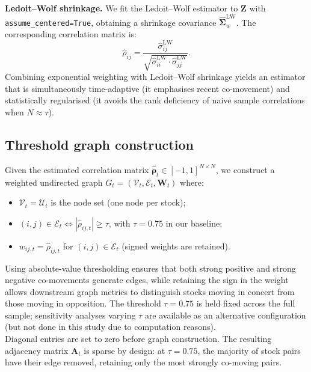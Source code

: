\documentclass{article}
\begin{document}
\noindent\textbf{Ledoit--Wolf shrinkage.} We fit the Ledoit--Wolf estimator \cite{ledoit2004} to $\mathbf{Z}$ with \texttt{assume\_centered=True}, obtaining a shrinkage covariance $\hat{\boldsymbol{\Sigma}}_w^{\text{LW}}$. The corresponding correlation matrix is:
\begin{equation}
    \hat{\rho}_{ij} = \frac{\hat{\sigma}_{ij}^{\text{LW}}}{\sqrt{\hat{\sigma}_{ii}^{\text{LW}} \cdot \hat{\sigma}_{jj}^{\text{LW}}}}.
\end{equation}
Combining exponential weighting with Ledoit--Wolf shrinkage yields an estimator that is simultaneously time-adaptive (it emphasises recent co-movement) and statistically regularised (it avoids the rank deficiency of naive sample correlations when $N \approx \tau$).

\subsection{Threshold graph construction}

Given the estimated correlation matrix $\hat{\boldsymbol{\rho}}_t \in [-1, 1]^{N \times N}$, we construct a weighted undirected graph $G_t = (\mathcal{V}_t, \mathcal{E}_t, \mathbf{W}_t)$ where:
\begin{itemize}
    \item $\mathcal{V}_t = \mathcal{U}_t$ is the node set (one node per stock);
    \item $(i,j) \in \mathcal{E}_t \iff |\hat{\rho}_{ij,t}| \geq \tau$, with $\tau = 0.75$ in our baseline;
    \item $w_{ij,t} = \hat{\rho}_{ij,t}$ for $(i,j) \in \mathcal{E}_t$ (signed weights are retained).
\end{itemize}

Using absolute-value thresholding ensures that both strong positive and strong negative co-movements generate edges, while retaining the sign in the weight allows downstream graph metrics to distinguish stocks moving in concert from those moving in opposition. The threshold $\tau = 0.75$ is held fixed across the full sample; sensitivity analyses varying $\tau$ are available as an alternative configuration (but not done in this study due to computation reasons).\\

Diagonal entries are set to zero before graph construction. The resulting adjacency matrix $\mathbf{A}_t$ is sparse by design: at $\tau = 0.75$, the majority of stock pairs have their edge removed, retaining only the most strongly co-moving pairs.
\end{document}
